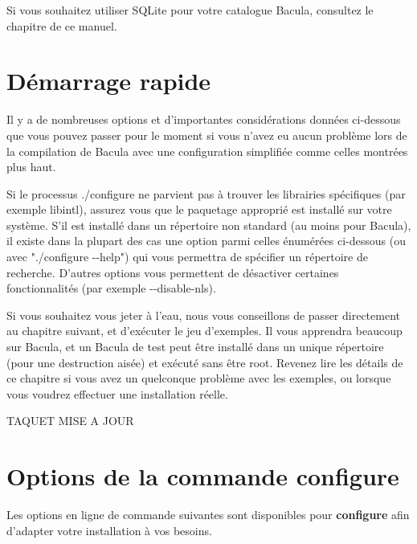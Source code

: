 {{{Si vous souhaitez utiliser SQLite pour votre catalogue Bacula, consultez le
chapitre 
 de ce manuel.

\section{D\'emarrage rapide}

Il y a de nombreuses options et d'importantes consid\'erations donn\'ees
ci-dessous que vous pouvez passer pour le moment si vous n'avez eu aucun
probl\`eme lors de la compilation de Bacula avec une configuration
simplifi\'ee comme celles montr\'ees plus haut. 

Si le processus ./configure ne parvient pas \`a trouver les librairies 
sp\'ecifiques (par exemple libintl), assurez vous que le paquetage appropri\'e 
est install\'e sur votre syst\`eme. S'il est install\'e dans un r\'epertoire non 
standard (au moins pour Bacula), il existe dans la plupart des cas une 
option parmi celles \'enum\'er\'ees ci-dessous (ou avec "./configure {-}{-}help") 
qui vous permettra de sp\'ecifier un r\'epertoire de recherche. D'autres options 
vous permettent de d\'esactiver certaines fonctionnalit\'es (par exemple 
{-}{-}disable-nls).

Si vous souhaitez vous jeter \`a l'eau, nous vous conseillons de passer
directement au chapitre suivant, et d'ex\'ecuter le jeu d'exemples. Il vous
apprendra beaucoup sur Bacula, et un Bacula de test peut \^etre install\'e
dans un unique r\'epertoire (pour une destruction ais\'ee) et ex\'ecut\'e sans
\^etre root. Revenez lire les d\'etails de ce chapitre si vous avez un
quelconque probl\`eme avec les exemples, ou lorsque vous voudrez effectuer une
installation r\'eelle. 

TAQUET MISE A JOUR

\section{Options de la commande {\bf configure}}
\label{Options}

Les options en ligne de commande suivantes sont disponibles pour {\bf
configure} afin d'adapter votre installation \`a vos besoins. 

}}}
